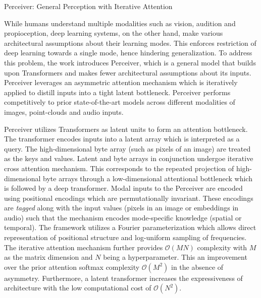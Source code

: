 \documentclass[11pt,letterpaper]{article}
\begin{document}
\begin{center}
  \large{Perceiver: General Perception with Iterative Attention}
\end{center}

While humans understand multiple modalities such as vision, audition and propioception, deep learning systems, on the other hand, make various architectural assumptions about their learning modes. This enforces restriction of deep learning towards a single mode, hence hindering generalization. To address this problem, the work introduces Perceiver, which is a general model that builds upon Transformers and makes fewer architectural assumptions about its inputs. Perceiver leverages an asymmetric attention mechanism which is iteratively applied to distill inputs into a tight latent bottleneck. Perceiver performs competitively to prior state-of-the-art models across different modalities of images, point-clouds and audio inputs.

Perceiver utilizes Transformers as latent units to form an attention bottleneck. The transformer encodes inputs into a latent array which is interpreted as a query. The high-dimensional byte array (such as pixels of an image) are treated as the keys and values. Latent and byte arrays in conjunction undergoe iterative cross attention mechanism. This corresponds to the repeated projection of high-dimensional byte arrays through a low-dimensional attentional bottleneck which is followed by a deep transformer. Modal inputs to the Perceiver are encoded using positional encodings which are permutationally invariant. These encodings are \textit{tagged} along with the input values (pixels in an image or embeddings in audio) such that the mechanism encodes mode-specific knowledge (spatial or temporal). The framework utilizes a Fourier parameterization which allows direct representation of positional structure and log-uniform sampling of frequencies. The iterative attention mechanism further provides $\mathcal{O}(MN)$ complexity with $M$ as the matrix dimension and $N$ being a hyperparameter. This an improvement over the prior attention softmax complexity $\mathcal{O}(M^{2})$ in the absence of asymmetry. Furthermore, a latent transformer increases the expressiveness of architecture with the low computational cost of $\mathcal{O}(N^{2})$.
\end{document}
